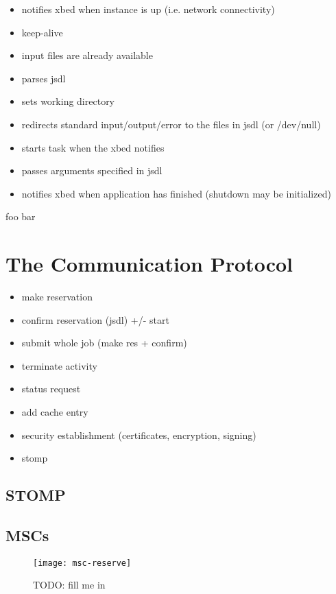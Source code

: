 \begin{itemize}
\item notifies xbed when instance is up (i.e. network connectivity)
\item keep-alive
\item input files are already available
\item parses jsdl
\item sets working directory
\item redirects standard input/output/error to the files in jsdl (or /dev/null)
\item starts task when the xbed notifies
\item passes arguments specified in jsdl
\item notifies xbed when application has finished (shutdown may be initialized)
\end{itemize}
foo bar

\section{The Communication Protocol}
\label{sec:communication-protocol}

\begin{itemize}
\item make reservation
\item confirm reservation (jsdl) +/- start
\item submit whole job (make res + confirm)
\item terminate activity
\item status request
\item add cache entry
\item security establishment (certificates, encryption, signing)
\item stomp
\end{itemize}

\subsection{STOMP}
\label{sec:protocol:stomp}

\subsection{MSCs}

\begin{figure}[ht]
  \centering
  \texttt{[image: msc-reserve]}
  \caption[MSC Make Reservation]{TODO: fill me in}
  \label{fig:msc-reserve}
\end{figure}

